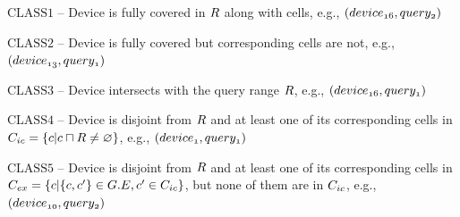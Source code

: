 \begin{frame}
\begin{columns}[c]
    \vspace{-15pt}
    \begin{itemize}
      \scriptsize{
      \item $\mathrm{CLASS1}$ -- \textrm{Device is fully covered in $\mathnormal{R}$ along with cells, e.g., $\mathnormal{(device_{16}, query_2)}$}
      \item $\mathrm{CLASS2}$ -- \textrm{Device is fully covered but corresponding cells are not,  e.g., $\mathnormal{(device_{13}, query_1)}$}
      \item $\mathrm{CLASS3}$ -- \textrm{Device intersects with the query range $\mathnormal{R}$,  e.g., $\mathnormal{(device_{16}, query_1)}$}
      \item $\mathrm{CLASS4}$ -- \textrm{Device is disjoint from $\mathnormal{R}$ and at least one of its corresponding cells in $\mathnormal{C_{ic} = \{ c|c \sqcap R \neq \varnothing \}}$,  e.g., $\mathnormal{(device_{1}, query_1)}$}
      \item $\mathrm{CLASS5}$ -- \textrm{Device is disjoint from $\mathnormal{R}$ and at least one of its corresponding cells in $\mathnormal{C_{ex} = \{ c| \{ c, c'\} \in G.E, c' \in C_{ic} \}}$, but none of them are in $\mathnormal{C_{ic}}$, e.g., $\mathnormal{(device_{10}, query_2)}$}
      }
    \end{itemize}

\end{columns}

\end{frame}


